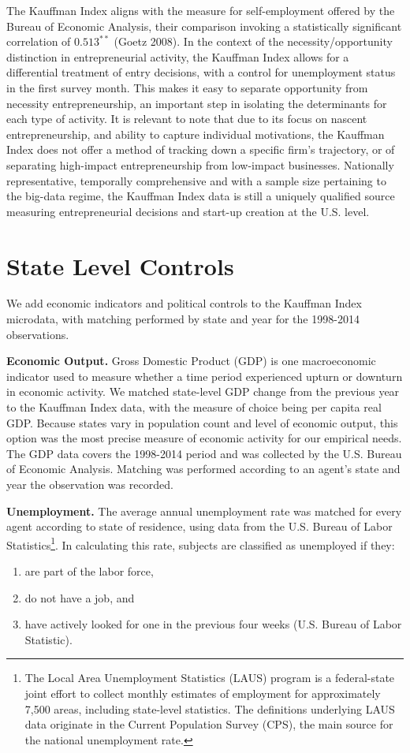 The Kauffman Index aligns with the measure for self-employment offered by the Bureau of Economic Analysis, their comparison invoking a statistically significant correlation of $0.513^{**}$ (Goetz 2008). In the context of the necessity/opportunity distinction in entrepreneurial activity, the Kauffman Index allows for a differential treatment of entry decisions, with a control for unemployment status in the first survey month. This makes it easy to separate opportunity from necessity entrepreneurship, an important step in isolating the determinants for each type of activity. It is relevant to note that due to its focus on nascent entrepreneurship, and ability to capture individual motivations, the Kauffman Index does not offer a method of tracking down a specific firm’s trajectory, or of separating high-impact entrepreneurship from low-impact businesses. Nationally representative, temporally comprehensive and with a sample size pertaining to the big-data regime, the Kauffman Index data is still a uniquely qualified source measuring entrepreneurial decisions and start-up creation at the U.S. level. 

\section{State Level Controls}
We add economic indicators and political controls to the Kauffman Index microdata, with matching performed by state and year for the 1998-2014 observations. 

\textbf{Economic Output.} Gross Domestic Product (GDP) is one macroeconomic indicator used to measure whether a time period experienced upturn or downturn in economic activity. We matched state-level GDP change from the previous year to the Kauffman Index data, with the measure of choice being per capita real GDP. Because states vary in population count and level of economic output, this option was the most precise measure of economic activity for our empirical needs. The GDP data covers the 1998-2014 period and was collected by the U.S. Bureau of Economic Analysis. Matching was performed according to an agent’s state and year the observation was recorded.  

\textbf{Unemployment.} The average annual unemployment rate was matched for every agent according to state of residence, using data from the U.S. Bureau of Labor Statistics\footnote{The Local Area Unemployment Statistics (LAUS) program is a federal-state joint effort to collect monthly estimates of employment for approximately 7,500 areas, including state-level statistics. The definitions underlying LAUS data originate in the Current Population Survey (CPS),  the main source for the national unemployment rate. 
}. In calculating this rate, subjects are classified as unemployed if they:
\renewcommand{\labelenumi}{\roman{enumi}}
\begin{enumerate}
   \item are part of the labor force,
   \item do not have a job, and
\item have actively looked for one in the previous four weeks (U.S. Bureau of Labor Statistic). 
\end{enumerate}

